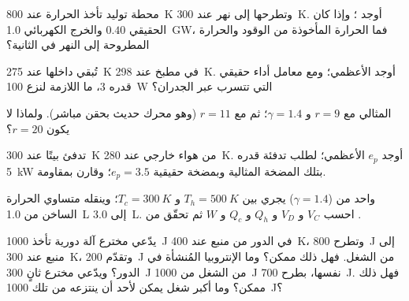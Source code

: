 \begin{exercise}[$\star$]\label{exo:b1:heat-engines:1}
محطة توليد تأخذ الحرارة عند \qty{800}{K} وتطرحها إلى نهر عند
\qty{300}{K}. أوجد ؛ وإذا كان  الحقيقي $0.40$ والخرج
الكهربائي \qty{1.0}{GW}، فما الحرارة المأخوذة من الوقود والحرارة
المطروحة إلى النهر في الثانية؟
\end{exercise}

\begin{exercise}[$\star$]\label{exo:b1:heat-engines:2}
 تُبقي داخلها عند \qty{275}{K} في مطبخ عند
\qty{298}{K}. أوجد  الأعظمي؛ ومع معامل أداء حقيقي قدره $3$،
ما  اللازمة لنزع \qty{100}{W} التي تتسرب عبر
الجدران؟
\end{exercise}

\begin{exercise}[$\star$]\label{exo:b1:heat-engines:3}
 المثالي  مع $r = 9$ و $\gamma = 1.4$؛ ثم مع
$r = 11$ (وهو محرك حديث بحقن مباشر). ولماذا لا يكون $r = 20$؟
\end{exercise}

\begin{exercise}[$\star$]\label{exo:b1:heat-engines:4}
 تدفئ بيتًا عند \qty{300}{K} من هواء خارجي عند \qty{280}{K}.
أوجد $e_p$ الأعظمي؛  لطلب تدفئة قدره \qty{5}{kW}
بتلك المضخة المثالية وبمضخة حقيقية $e_p = 3.5$؛ وقارن
بمقاومة.
\end{exercise}

\begin{exercise}[$\star\star$]\label{exo:b1:heat-engines:5}
 واحد من  ($\gamma = 1.4$) يجري  بين
$T_h = \qty{500}{K}$ و $T_c = \qty{300}{K}$؛ وينقله متساوي الحرارة الساخن من
\qty{1.0}{L} إلى \qty{3.0}{L}. احسب $V_C$ و $V_D$ و $Q_h$ و $Q_c$ و $W$ ثم
تحقّق من .
\end{exercise}

\begin{exercise}[$\star\star$]\label{exo:b1:heat-engines:6}
يدّعي مخترع آلة دورية تأخذ \qty{1000}{J} في الدور
من منبع عند \qty{400}{K}، وتطرح \qty{800}{J} إلى منبع عند
\qty{300}{K}، وتقدّم \qty{200}{J} من الشغل. فهل ذلك ممكن؟ وما الإنتروبيا المُنشأة
في الدور؟ ويدّعي مخترع ثانٍ \qty{300}{J} من الشغل من
\qty{1000}{J} نفسها، بطرح \qty{700}{J}. فهل ذلك ممكن؟ وما أكبر شغل
يمكن لأحد أن ينتزعه من تلك \qty{1000}{J}؟
\end{exercise}

